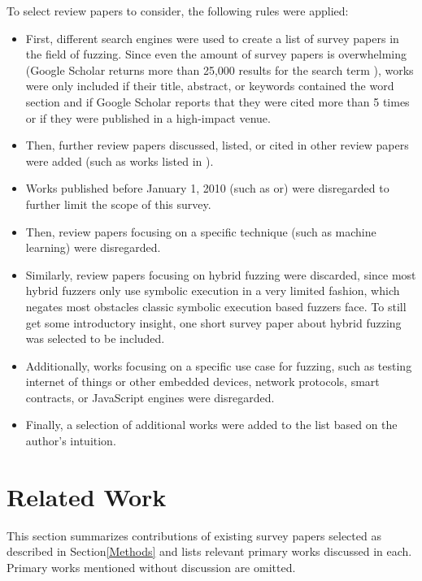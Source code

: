 \documentclass{article}
\begin{document}
\begin{multicols}{2}
    To select review papers to consider, the following rules were applied:
    \begin{itemize}
        \item First, different search engines were used to create a list of survey papers in the field of fuzzing. Since even the amount of survey papers is overwhelming (Google Scholar\cite{GoogleScholar} returns more than 25,000 results for the search term ), works were only included if their title, abstract, or keywords contained the word section  and if Google Scholar\cite{GoogleScholar} reports that they were cited more than 5 times or if they were published in a high-impact venue.
        \item Then, further review papers discussed, listed, or cited in other review papers were added (such as works listed in \cite{Demystifying}).
        \item Works published before January 1, 2010 (such as\cite{ViolatingAssumptionsWithFuzzing} or\cite{NewTrendsSymbex}) were disregarded to further limit the scope of this survey.
        \item Then, review papers focusing on a specific technique (such as machine learning\cite{ML1, ML2}) were disregarded.
        \item Similarly, review papers focusing on hybrid fuzzing\cite{Hybrid, Exploratory} were discarded, since most hybrid fuzzers only use symbolic execution in a very limited fashion, which negates most obstacles classic symbolic execution based fuzzers face. To still get some introductory insight, one short survey paper about hybrid fuzzing\cite{SurveyHybrid} was selected to be included.
        \item Additionally, works focusing on a specific use case for fuzzing, such as testing internet of things or other embedded devices\cite{IoT, Embedded, Embedded2}, network protocols\cite{Network, Network2023}, smart contracts\cite{Ethereum}, or JavaScript engines\cite{JavaScript, JavaScript2} were disregarded.
        \item Finally, a selection of additional works were added to the list based on the author's intuition.
    \end{itemize}

    \section{Related Work}
    \label{SurveyPapers}

    This section summarizes contributions of existing survey papers selected as described in Section\ref{Methods} and lists relevant primary works discussed in each. Primary works mentioned without discussion are omitted.


\end{multicols}
\end{document}

